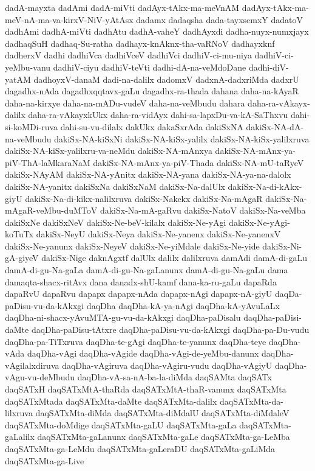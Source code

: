 {dadA-mayxta
dadAmi
dadA-miVti
dadAyx-tAkx-ma-meVnAM
dadAyx-tAkx-ma-meV-nA-ma-va-kirxV-NiV-yAtAsx
dadamx
dadaqsha
dada-tayxsemxY
dadatoV
dadhAmi
dadhA-miVti
dadhAtu
dadhA-vaheY
dadhAyxdi
dadha-nuyx-numxjayx
dadhaqSuH
dadhaq-Su-ratha
dadhayx-knAknx-tha-vaRNoV
dadhayxknf
dadherxV
dadhi
dadhiVca
dadhiVceV
dadhiVci
dadhiV-ci-mu-niya
dadhiV-ci-yeMbu-vanu
dadhiV-ciyu
dadhiV-teVti
dadhi-dA-na-veMdoDane
dadhi-diV-yatAM
dadhoyxV-danaM
dadi-na-dalilx
dadomxV
dadxnA-dadxriMda
dadxrU
dagadhx-nAda
dagadhxqqtavx-gaLu
dagadhx-ra-thada
dahana
daha-na-kAyaR
daha-na-kirxye
daha-na-mADu-vudeV
daha-na-veMbudu
dahara
daha-ra-vAkayx-dalilx
daha-ra-vAkayxkUkx
daha-ra-vidAyx
dahi-sa-lapxDu-va-kA-SaThxvu
dahi-si-koMDi-ruva
dahi-su-vu-dilalx
dakUkx
dakaSxrAda
dakiSxNA
dakiSx-NA-dA-na-veMbudu
dakiSx-NA-kiSxNi
dakiSx-NA-kiSx-yalilx
dakiSx-NA-kiSx-yalilxruva
dakiSx-NA-kiSx-yalilxru-va-neMdu
dakiSx-NA-mAnxya
dakiSx-NA-mAnx-ya-piV-ThA-laMkaraNaM
dakiSx-NA-mAnx-ya-piV-Thada
dakiSx-NA-mU-taRyeV
dakiSx-NAyAM
dakiSx-NA-yAnitx
dakiSx-NA-yana
dakiSx-NA-ya-na-dalolx
dakiSx-NA-yanitx
dakiSxNa
dakiSxNaM
dakiSx-Na-dalUlx
dakiSx-Na-di-kAkx-giyU
dakiSx-Na-di-kikx-nalilxruva
dakiSx-Nakekx
dakiSx-Na-mAgaR
dakiSx-Na-mAgaR-veMbu-duMToV
dakiSx-Na-mA-gaRvu
dakiSx-NatoV
dakiSx-Na-veMba
dakiSxNe
dakiSxNeV
dakiSx-Ne-beV-kilalx
dakiSx-Ne-yAgi
dakiSx-Ne-yAgi-koTuTx
dakiSx-NeyU
dakiSx-Neya
dakiSx-Ne-yanenx
dakiSx-Ne-yanenxV
dakiSx-Ne-yanunx
dakiSx-NeyeV
dakiSx-Ne-yiMdale
dakiSx-Ne-yide
dakiSx-Ni-gA-giyeV
dakiSx-Nige
daknAgxtf
dalUlx
dalilx
dalilxruva
damAdi
damA-di-gaLu
damA-di-gu-Na-gaLa
damA-di-gu-Na-gaLanunx
damA-di-gu-Na-gaLu
dama
damaqta-shacx-ritAvx
dana
danadx-shU-kamf
dana-ka-ru-gaLu
dapaRda
dapaRvU
dapaRvu
dapapx
dapapx-nAda
dapapx-nAgi
dapapx-nA-giyU
daqDa-paDisu-vu-da-kAkxgi
daqDha
daqDha-kA-ya-nAgi
daqDha-kA-yAvuLaLx
daqDha-ni-shacx-yAvuMTA-gu-vu-da-kAkxgi
daqDha-paDisalu
daqDha-paDisi-daMte
daqDha-paDisu-tAtxre
daqDha-paDisu-vu-da-kAkxgi
daqDha-pa-Du-vudu
daqDha-pa-TiTxruva
daqDha-te-gAgi
daqDha-te-yanunx
daqDha-teye
daqDha-vAda
daqDha-vAgi
daqDha-vAgide
daqDha-vAgi-de-yeMbu-danunx
daqDha-vAgilalxdiruva
daqDha-vAgiruva
daqDha-vAgiru-vudu
daqDha-vAgiyU
daqDha-vAgu-vu-deMbudu
daqDha-vA-sa-nA-ba-la-diMda
daqSAMta
daqSATx
daqSATxH
daqSATxMtA-thaRda
daqSATxMtA-thaR-vanunx
daqSATxMta
daqSATxMtada
daqSATxMta-daMte
daqSATxMta-dalilx
daqSATxMta-da-lilxruva
daqSATxMta-diMda
daqSATxMta-diMdalU
daqSATxMta-diMdaleV
daqSATxMta-doMdige
daqSATxMta-gaLU
daqSATxMta-gaLa
daqSATxMta-gaLalilx
daqSATxMta-gaLanunx
daqSATxMta-gaLe
daqSATxMta-ga-LeMba
daqSATxMta-ga-LeMdu
daqSATxMta-gaLeraDU
daqSATxMta-gaLiMda
daqSATxMta-ga-Live
}
